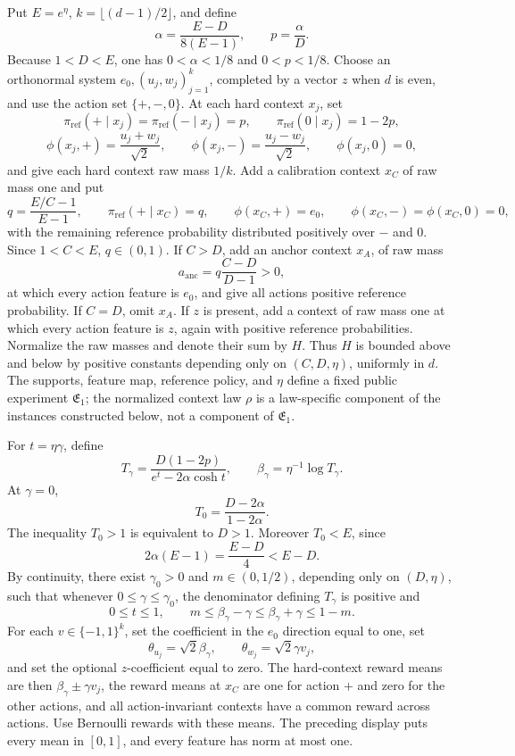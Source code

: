 Put \(E=e^\eta\), \(k=\lfloor(d-1)/2\rfloor\), and define
\[
\alpha=\frac{E-D}{8(E-1)},\qquad p=\frac{\alpha}{D}.
\]
Because \(1<D<E\), one has \(0<\alpha<1/8\) and \(0<p<1/8\). Choose an orthonormal system \(e_0,(u_j,w_j)_{j=1}^k\), completed by a vector \(z\) when \(d\) is even, and use the action set \(\{+,-,0\}\). At each hard context \(x_j\), set
\[
\pi_{\mathrm{ref}}(+\mid x_j)=\pi_{\mathrm{ref}}(-\mid x_j)=p,
\qquad \pi_{\mathrm{ref}}(0\mid x_j)=1-2p,
\]
\[
\phi(x_j,+)=\frac{u_j+w_j}{\sqrt2},\qquad
\phi(x_j,-)=\frac{u_j-w_j}{\sqrt2},\qquad
\phi(x_j,0)=0,
\]
and give each hard context raw mass \(1/k\). Add a calibration context \(x_C\) of raw mass one and put
\[
q=\frac{E/C-1}{E-1},\qquad
\pi_{\mathrm{ref}}(+\mid x_C)=q,\qquad
\phi(x_C,+)=e_0,\qquad
\phi(x_C,-)=\phi(x_C,0)=0,
\]
with the remaining reference probability distributed positively over \(-\) and \(0\). Since \(1<C<E\), \(q\in(0,1)\). If \(C>D\), add an anchor context \(x_A\), of raw mass
\[
a_{\mathrm{anc}}=q\frac{C-D}{D-1}>0,
\]
at which every action feature is \(e_0\), and give all actions positive reference probability. If \(C=D\), omit \(x_A\). If \(z\) is present, add a context of raw mass one at which every action feature is \(z\), again with positive reference probabilities. Normalize the raw masses and denote their sum by \(H\). Thus \(H\) is bounded above and below by positive constants depending only on \((C,D,\eta)\), uniformly in \(d\). The supports, feature map, reference policy, and \(\eta\) define a fixed public experiment \(\mathfrak E_1\); the normalized context law \(\rho\) is a law-specific component of the instances constructed below, not a component of \(\mathfrak E_1\).

For \(t=\eta\gamma\), define
\[
T_\gamma=\frac{D(1-2p)}{e^t-2\alpha\cosh t},
\qquad \beta_\gamma=\eta^{-1}\log T_\gamma.
\]
At \(\gamma=0\),
\[
T_0=\frac{D-2\alpha}{1-2\alpha}.
\]
The inequality \(T_0>1\) is equivalent to \(D>1\). Moreover \(T_0<E\), since
\[
2\alpha(E-1)=\frac{E-D}{4}<E-D.
\]
By continuity, there exist \(\gamma_0>0\) and \(m\in(0,1/2)\), depending only on \((D,\eta)\), such that whenever \(0\le\gamma\le\gamma_0\), the denominator defining \(T_\gamma\) is positive and
\[
0\le t\le1,\qquad
m\le\beta_\gamma-\gamma\le\beta_\gamma+\gamma\le1-m.
\]
For each \(v\in\{-1,1\}^k\), set the coefficient in the \(e_0\) direction equal to one, set
\[
\theta_{u_j}=\sqrt2\beta_\gamma,\qquad
\theta_{w_j}=\sqrt2\gamma v_j,
\]
and set the optional \(z\)-coefficient equal to zero. The hard-context reward means are then \(\beta_\gamma\pm\gamma v_j\), the reward means at \(x_C\) are one for action \(+\) and zero for the other actions, and all action-invariant contexts have a common reward across actions. Use Bernoulli rewards with these means. The preceding display puts every mean in \([0,1]\), and every feature has norm at most one.

